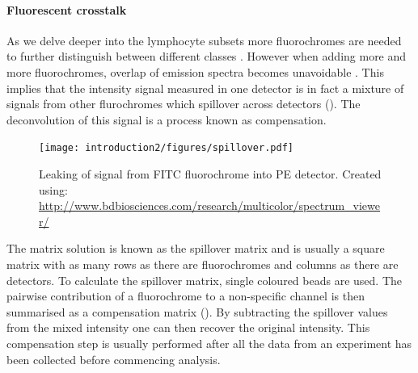 \paragraph{Fluorescent crosstalk}
As we delve deeper into the lymphocyte subsets more fluorochromes are needed to further distinguish between different classes \citep{Perfetto:2004cy}.
However when adding more and more fluorochromes, overlap of emission spectra becomes unavoidable \citep{Roederer:2001vi}.
This implies that the intensity signal measured in one detector is in fact a mixture of signals from other flurochromes which spillover across detectors ().
The deconvolution of this signal is a process known as compensation.
\begin{figure}[h]
\begin{center}
   \texttt{[image: introduction2/figures/spillover.pdf]}
\end{center}
{ Leaking of signal from FITC fluorochrome into PE detector.}
{
  \small{Created using: \url{http://www.bdbiosciences.com/research/multicolor/spectrum_viewer/}}
}
\end{figure}
The matrix solution is known as the spillover matrix and is usually a square matrix with as many rows as there are fluorochromes and columns as there are detectors.
To calculate the spillover matrix, single coloured beads are used. 
The pairwise contribution of a fluorochrome to a non-specific channel is then summarised as a compensation matrix ().
By subtracting the spillover values from the mixed intensity one can then recover the original intensity.
This compensation step is usually performed after all the data from an experiment has been collected before commencing analysis.  
